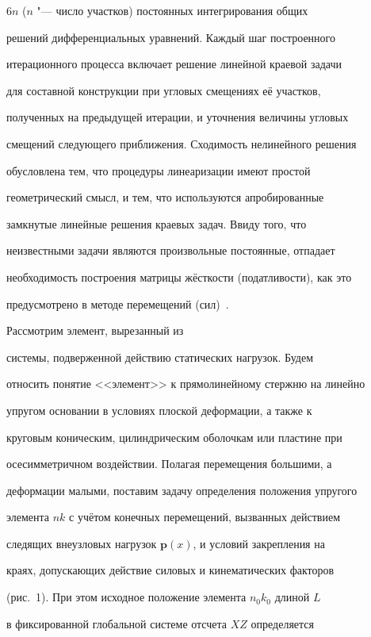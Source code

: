 $6n$ ($n$ "--- число участков) постоянных интегрирования общих

решений дифференциальных уравнений. Каждый шаг построенного

итерационного процесса включает решение линейной краевой задачи

для составной конструкции при угловых смещениях её участков,

полученных на предыдущей итерации, и уточнения величины угловых

смещений следующего приближения. Сходимость нелинейного решения

обусловлена тем, что процедуры линеаризации имеют простой

геометрический смысл, и тем, что используются апробированные

замкнутые линейные решения краевых задач. Ввиду того, что

неизвестными задачи являются произвольные постоянные, отпадает

необходимость построения матрицы жёсткости (податливости), как это

предусмотрено в методе перемещений (сил)~\cite{elen:bib4}.



\smallskip



 Рассмотрим элемент, вырезанный из

системы, подверженной действию статических нагрузок. Будем

относить понятие <<элемент>> к прямолинейному стержню на линейно

упругом основании в условиях плоской деформации, а также к

круговым коническим, цилиндрическим оболочкам или пластине при

осесимметричном воздействии. Полагая перемещения большими, а

деформации малыми, поставим задачу определения положения упругого

элемента $nk$ с учётом конечных перемещений, вызванных действием

следящих внеузловых нагрузок $\textbf{p}(x)$, и условий закрепления на

краях, допускающих действие силовых и кинематических факторов

(рис.~1). При этом исходное положение элемента $n_0k_0$ длиной $L$

в фиксированной глобальной системе отсчета $XZ$ определяется

